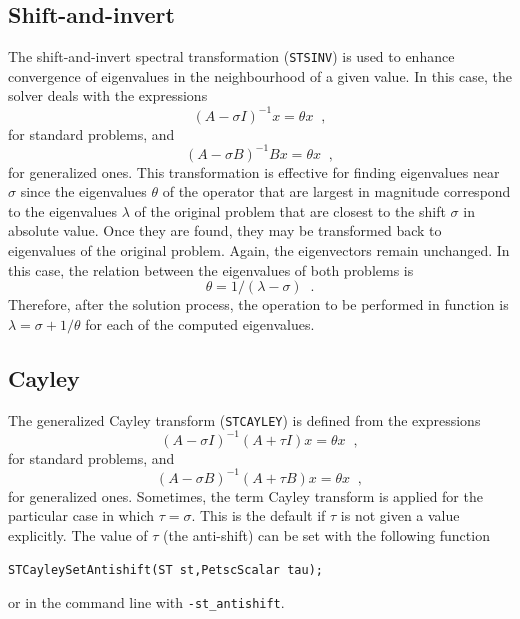 \subsection{Shift-and-invert}

	The shift-and-invert spectral transformation (\texttt{STSINV}) is used to enhance convergence of eigenvalues in the neighbourhood of a given value. In this case, the solver deals with the expressions 
\begin{equation}(A-\sigma I)^{-1}x=\theta x\;\;,\end{equation}
for standard problems, and 
\begin{equation}(A-\sigma B)^{-1}B x=\theta x\;\;,\end{equation}
for generalized ones. 
This transformation is effective for finding eigenvalues near $\sigma$ since the eigenvalues $\theta$ of the operator that are largest in magnitude correspond to the eigenvalues $\lambda$ of the original problem that are closest to the shift $\sigma$ in absolute value. Once they are found, they may be transformed back to eigenvalues of the original problem. Again, the eigenvectors remain unchanged.
In this case, the relation between the eigenvalues of both problems is
\begin{equation}\theta=1/(\lambda-\sigma)\;\;.\end{equation}
Therefore, after the solution process, the operation to be performed in function  is $\lambda=\sigma+1/\theta$ for each of the computed eigenvalues.

\subsection{Cayley}
\label{sec:cayley}

	The generalized Cayley transform (\texttt{STCAYLEY}) is defined from the expressions
\begin{equation}(A-\sigma I)^{-1}(A+\tau I)x=\theta x\;\;,\end{equation}
for standard problems, and 
\begin{equation}(A-\sigma B)^{-1}(A+\tau B)x=\theta x\;\;,\end{equation}
for generalized ones. Sometimes, the term Cayley transform is applied for the particular case in which $\tau=\sigma$. This is the default if $\tau$ is not given a value explicitly. The value of $\tau$ (the anti-shift) can be set with the following function
	\begin{Verbatim}[fontsize=\small]
	STCayleySetAntishift(ST st,PetscScalar tau);
	\end{Verbatim}
or in the command line with \Verb!-st_antishift!.


